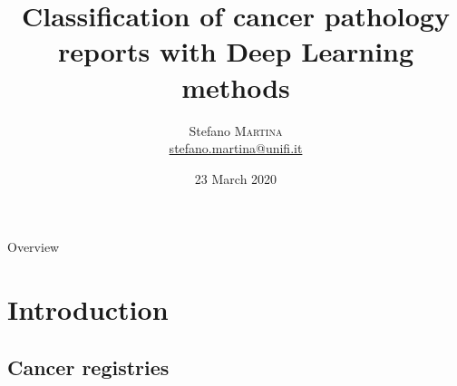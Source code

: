 






\title[]{\textbf{Classification of cancer pathology reports with Deep
  Learning methods}}
\date[23 March 2020]{23 March 2020}

\author[Stefano Martina]{
  \begin{center}
    \begin{tabular}{lr}
      Stefano \textsc{Martina}\\
      \href{mailto:stefano.martina@unifi.it}{stefano.martina@unifi.it}\\
    \end{tabular}
  \end{center}
}




\begin{frame}[plain]
  \titlepage
\end{frame}

\begin{frame}{Overview}
  \tableofcontents
\end{frame}

\section{Introduction}

\subsection{Cancer registries}

